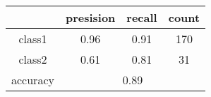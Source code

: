 
    \begin{tabular}{ | c | c | c | c | }
	\hline
	 & presision & recall & count \\ \hline
	class1 & 0.96 & 0.91 & 170 \\ \hline
	class2 & 0.61 & 0.81 & 31  \\ \hline
	\hline
	accuracy & \multicolumn{3}{c|}{0.89} \\
	\hline
    \end{tabular}